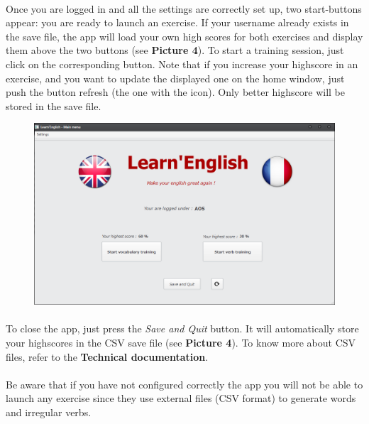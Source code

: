 \documentclass[12pt, a4paper]{report}
\begin{document}
\paragraph{}Once you are logged in and all the settings are correctly set up, two start-buttons appear: you are ready to launch an exercise. If your username already exists in the save file, the app will load your own high scores for both exercises and display them above the two buttons (see \textbf{Picture 4}). To start a training session, just click on the corresponding button. Note that if you increase your highscore in an exercise, and you want to update the displayed one on the home window, just push the button refresh (the one with the icon). Only better highscore will be stored in the save file.
\begin{figure}[H]
    \centering
    \includegraphics[scale=0.55]{images/homelogged.png}
\end{figure}


\paragraph{}To close the app, just press the \textit{Save and Quit} button. It will automatically store your highscores in the CSV save file (see \textbf{Picture 4}). To know more about CSV files, refer to the \textbf{Technical documentation}.

\paragraph{}Be aware that if you have not configured correctly the app you will not be able to launch any exercise since they use external files (CSV format) to generate words and irregular verbs.
\end{document}
